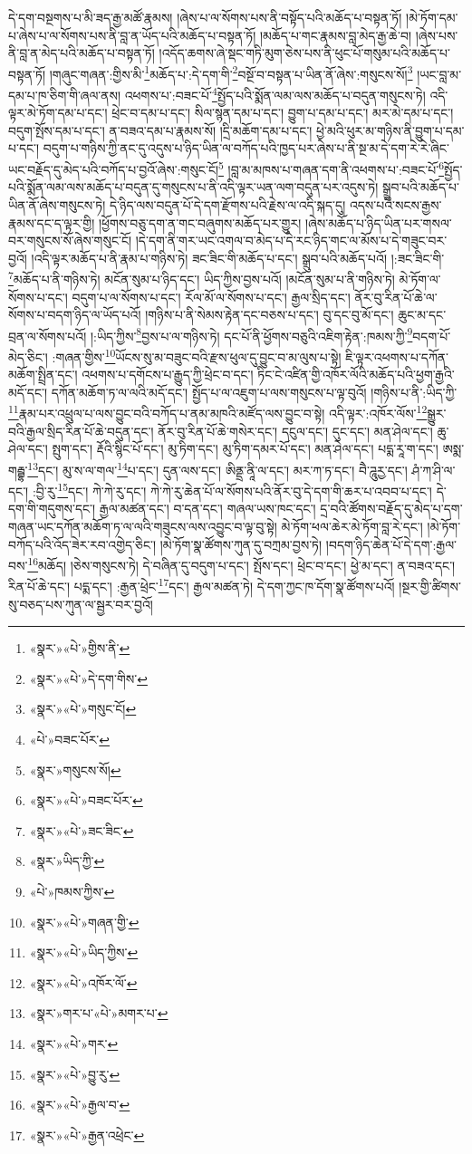 དེ་དག་བསྔགས་པ་མི་ཟད་རྒྱ་མཚོ་རྣམས། །ཞེས་པ་ལ་སོགས་པས་ནི་བསྟོད་པའི་མཆོད་པ་བསྟན་ཏོ། །མེ་ཏོག་དམ་པ་ཞེས་པ་ལ་སོགས་པས་ནི་བླ་ན་ཡོད་པའི་མཆོད་པ་བསྟན་ཏོ། །མཆོད་པ་གང་རྣམས་བླ་མེད་རྒྱ་ཆེ་བ། །ཞེས་པས་ནི་བླ་ན་མེད་པའི་མཆོད་པ་བསྟན་ཏོ། །འདོད་ཆགས་ཞེ་སྡང་གཏི་མུག་ཅེས་པས་ནི་ཕུང་པོ་གསུམ་པའི་མཆོད་པ་བསྟན་ཏོ། །གཞུང་གཞན་:གྱིས་མི་\footnote{«སྣར་»«པེ་»གྱིས་ནི་}མཆོད་པ་:དེ་དག་གི་\footnote{«སྣར་»«པེ་»དེ་དག་གིས་}བསྔོ་བ་བསྟན་པ་ཡིན་ནོ་ཞེས་:གསུངས་སོ།\footnote{«སྣར་»«པེ་»གསུང་ངོ།} །ཡང་བླ་མ་དམ་པ་ཁ་ཅིག་གི་ཞལ་ནས། འཕགས་པ་:བཟང་པོ་\footnote{«པེ་»བཟང་པོར་}སྤྱོད་པའི་སྨོན་ལམ་ལས་མཆོད་པ་བདུན་གསུངས་ཏེ། འདི་ལྟར་མེ་ཏོག་དམ་པ་དང་། ཕྲེང་བ་དམ་པ་དང་། སིལ་སྙན་དམ་པ་དང་། བྱུག་པ་དམ་པ་དང་། མར་མེ་དམ་པ་དང་། བདུག་སྤོས་དམ་པ་དང་། ན་བཟའ་དམ་པ་རྣམས་སོ། །དྲི་མཆོག་དམ་པ་དང་། ཕྱེ་མའི་ཕུར་མ་གཉིས་ནི་བྱུག་པ་དམ་པ་དང་། བདུག་པ་གཉིས་ཀྱི་ནང་དུ་འདུས་པ་ཉིད་ཡིན་ལ་བཀོད་པའི་ཁྱད་པར་ཞེས་པ་ནི་སྔ་མ་དེ་དག་རེ་རེ་ཞིང་ཡང་བརྗོད་དུ་མེད་པའི་བཀོད་པ་བྱའོ་ཞེས་:གསུང་ངོ།\footnote{«སྣར་»གསུངས་སོ།} །བླ་མ་མཁས་པ་གཞན་དག་ནི་འཕགས་པ་:བཟང་པོ་\footnote{«སྣར་»«པེ་»བཟང་པོར་}སྤྱོད་པའི་སྨོན་ལམ་ལས་མཆོད་པ་བདུན་དུ་གསུངས་པ་ནི་འདི་ལྟར་ཡན་ལག་བདུན་པར་འདུས་ཏེ། སྒྲུབ་པའི་མཆོད་པ་ཡིན་ནོ་ཞེས་གསུངས་ཏེ། དེ་ཉིད་ལས་བདུན་པོ་དེ་དག་རྫོགས་པའི་རྗེས་ལ་འདི་སྐད་དུ། འདས་པའི་སངས་རྒྱས་རྣམས་དང་ད་ལྟར་གྱི། །ཕྱོགས་བཅུ་དག་ན་གང་བཞུགས་མཆོད་པར་གྱུར། །ཞེས་མཆོད་པ་ཉིད་ཡིན་པར་གསལ་བར་གསུངས་སོ་ཞེས་གསུང་ངོ། །དེ་དག་ནི་གར་ཡང་འགལ་བ་མེད་པ་དེ་རང་ཉིད་གང་ལ་མོས་པ་དེ་གཟུང་བར་བྱའོ། །འདི་ལྟར་མཆོད་པ་ནི་རྣམ་པ་གཉིས་ཏེ། ཟང་ཟིང་གི་མཆོད་པ་དང་། སྒྲུབ་པའི་མཆོད་པའོ། །:ཟང་ཟིང་གི་\footnote{«སྣར་»«པེ་»ཟང་ཟིང་}མཆོད་པ་ནི་གཉིས་ཏེ། མངོན་སུམ་པ་ཉིད་དང་། ཡིད་ཀྱིས་བྱས་པའོ། །མངོན་སུམ་པ་ནི་གཉིས་ཏེ། མེ་ཏོག་ལ་སོགས་པ་དང་། བདུག་པ་ལ་སོགས་པ་དང་། རོལ་མོ་ལ་སོགས་པ་དང་། རྒྱལ་སྲིད་དང་། ནོར་བུ་རིན་པོ་ཆེ་ལ་སོགས་པ་བདག་ཉིད་ལ་ཡོད་པའོ། །གཉིས་པ་ནི་སེམས་རྟེན་དང་བཅས་པ་དང་། བུ་དང་བུ་མོ་དང་། ཆུང་མ་དང་བྲན་ལ་སོགས་པའོ། །:ཡིད་ཀྱིས་\footnote{«སྣར་»ཡིད་ཀྱི་}བྱས་པ་ལ་གཉིས་ཏེ། དང་པོ་ནི་ཕྱོགས་བཅུའི་འཇིག་རྟེན་:ཁམས་ཀྱི་\footnote{«པེ་»ཁམས་ཀྱིས་}བདག་པོ་མེད་ཅིང་། :གཞན་གྱིས་\footnote{«སྣར་»«པེ་»གཞན་གྱི་}ཡོངས་སུ་མ་བཟུང་བའི་རྫས་ཕུལ་དུ་བྱུང་བ་མ་ལུས་པ་སྟེ། ཇི་ལྟར་འཕགས་པ་དཀོན་མཆོག་སྤྲིན་དང་། འཕགས་པ་དགོངས་པ་རྒྱུད་ཀྱི་ཕྲེང་བ་དང་། ཏིང་ངེ་འཛིན་གྱི་འཁོར་ལོའི་མཆོད་པའི་ཕྱག་རྒྱའི་མདོ་དང་། དཀོན་མཆོག་ཏ་ལ་ལའི་མདོ་དང་། སྤྱོད་པ་ལ་འཇུག་པ་ལས་གསུངས་པ་ལྟ་བུའོ། །གཉིས་པ་ནི་:ཡིད་ཀྱི་\footnote{«སྣར་»«པེ་»ཡིད་ཀྱིས་}རྣམ་པར་འཕྲུལ་པ་ལས་བྱུང་བའི་བཀོད་པ་ནམ་མཁའི་མཛོད་ལས་བྱུང་བ་སྟེ། འདི་ལྟར་:འཁོར་ལོས་\footnote{«སྣར་»«པེ་»འཁོར་ལོ་}སྒྱུར་བའི་རྒྱལ་སྲིད་རིན་པོ་ཆེ་བདུན་དང་། ནོར་བུ་རིན་པོ་ཆེ་གསེར་དང་། དངུལ་དང་། དུང་དང་། མན་ཤེལ་དང་། ཆུ་ཤེལ་དང་། སྤུག་དང་། རྡོའི་སྙིང་པོ་དང་། མུ་ཏིག་དང་། མུ་ཏིག་དམར་པོ་དང་། མན་ཤེལ་དང་། པདྨ་རཱ་ག་དང་། ཨསྨ་གརྦྷ་\footnote{«སྣར་»གར་པ་«པེ་»མགར་པ་}དང་། མུ་ས་ལ་གལ་\footnote{«སྣར་»«པེ་»གར་}པ་དང་། དུན་ལས་དང་། ཨིནྡྲ་ནཱི་ལ་དང་། མར་ཀ་ཏ་དང་། བཻ་ཌཱུརྱ་དང་། ཤཾ་ཀ་ཤི་ལ་དང་། :བྱི་རུ་\footnote{«སྣར་»«པེ་»བྱུ་རུ་}དང་། ཀེ་ཀེ་རུ་དང་། ཀེ་ཀེ་རུ་ཆེན་པོ་ལ་སོགས་པའི་ནོར་བུ་དེ་དག་གི་ཆར་པ་འབབ་པ་དང་། དེ་དག་གི་གདུགས་དང་། རྒྱལ་མཚན་དང་། བ་དན་དང་། གཞལ་ཡས་ཁང་དང་། དྲ་བའི་ཚོགས་བརྗོད་དུ་མེད་པ་དག་གཞན་ཡང་དཀོན་མཆོག་ཏ་ལ་ལའི་གཟུངས་ལས་འབྱུང་བ་ལྟ་བུ་སྟེ། མེ་ཏོག་ཕལ་ཆེར་མེ་ཏོག་བླ་རེ་དང་། །མེ་ཏོག་བཀོད་པའི་འོད་ཟེར་རབ་འགྱེད་ཅིང་། །མེ་ཏོག་སྣ་ཚོགས་ཀུན་དུ་བཀྲམ་བྱས་ཏེ། །བདག་ཉིད་ཆེན་པོ་དེ་དག་:རྒྱལ་བས་\footnote{«སྣར་»«པེ་»རྒྱལ་བ་}མཆོད། །ཅེས་གསུངས་ཏེ། དེ་བཞིན་དུ་བདུག་པ་དང་། སྤོས་དང་། ཕྲེང་བ་དང་། ཕྱེ་མ་དང་། ན་བཟའ་དང་། རིན་པོ་ཆེ་དང་། པདྨ་དང་། :རྒྱན་ཕྲེང་\footnote{«སྣར་»«པེ་»རྒྱན་འཕྲེང་}དང་། རྒྱལ་མཚན་ཏེ། དེ་དག་ཀྱང་ཁ་དོག་སྣ་ཚོགས་པའོ། །སྔར་གྱི་ཚིགས་སུ་བཅད་པས་ཀུན་ལ་སྦྱར་བར་བྱའོ། 